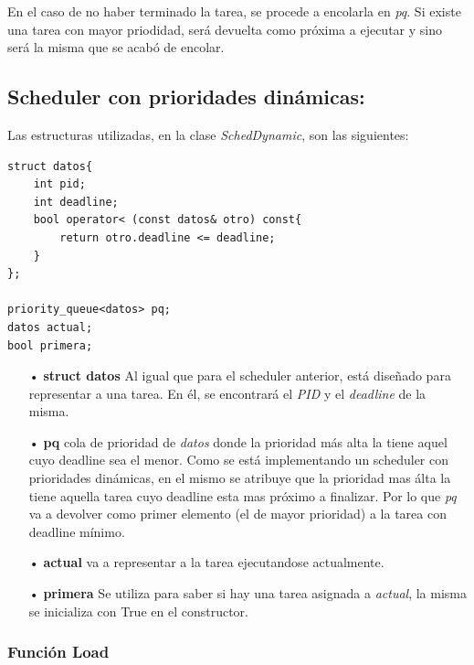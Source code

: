 \documentclass[a4paper]{article}
\begin{document}
En el caso de no haber terminado la tarea, se procede a encolarla en \emph{pq}. Si existe una tarea con mayor priodidad, ser\'a devuelta como próxima a ejecutar y sino ser\'a la misma que se acab\'o de encolar. \\ 


 
\bigskip 

\subsection*{Scheduler con prioridades dinámicas:}

Las estructuras utilizadas, en la clase \emph{SchedDynamic}, son las siguientes:
	\begin{codesnippet}
	\begin{verbatim}
struct datos{
    int pid;
    int deadline;
    bool operator< (const datos& otro) const{
        return otro.deadline <= deadline; 
    }
};

priority_queue<datos> pq;
datos actual;
bool primera;
	\end{verbatim}
	\end{codesnippet}
	
	\begin{itemize}
	
	\item[•]\textbf{struct datos} Al igual que para el scheduler anterior, est\'a diseñado para representar a una tarea. En él, se encontrar\'a el \emph{PID} y el \emph{deadline} de la misma.
	\item[•]\textbf{pq} cola de prioridad de \emph{datos} donde la prioridad más alta la tiene aquel cuyo deadline sea el menor. Como se est\'a implementando un scheduler con prioridades dinámicas, en el mismo se atribuye que la prioridad mas álta la tiene aquella tarea cuyo deadline esta mas próximo a finalizar. Por lo que \emph{pq} va a devolver como primer elemento (el de mayor prioridad) a la tarea con deadline m\'inimo.
	\item[•]\textbf{actual} va a representar a la tarea ejecutandose actualmente.
	\item[•]\textbf{primera} Se utiliza para saber si hay una tarea asignada a \emph{actual}, la misma se inicializa con True en el constructor.
	\end{itemize}	

\subsubsection*{Funci\'on Load}
\end{document}
